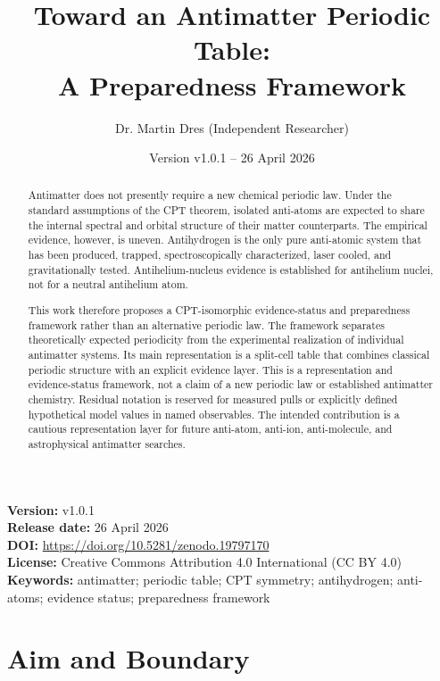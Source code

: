 \documentclass[11pt,a4paper]{article}
\title{Toward an Antimatter Periodic Table:\\
A Preparedness Framework}
\author{Dr. Martin Dres (Independent Researcher)}
\date{Version v1.0.1 -- 26 April 2026}
\begin{document}
\maketitle

\begin{center}
\small
\textbf{Version:} v1.0.1\\
\textbf{Release date:} 26 April 2026\\
\textbf{DOI:} \url{https://doi.org/10.5281/zenodo.19797170}\\
\textbf{License:} Creative Commons Attribution 4.0 International (CC BY 4.0)\\
\textbf{Keywords:} antimatter; periodic table; CPT symmetry; antihydrogen; anti-atoms; evidence status; preparedness framework
\end{center}

\begin{abstract}
Antimatter does not presently require a new chemical periodic law. Under the standard assumptions of the CPT theorem, isolated anti-atoms are expected to share the internal spectral and orbital structure of their matter counterparts. The empirical evidence, however, is uneven. Antihydrogen is the only pure anti-atomic system that has been produced, trapped, spectroscopically characterized, laser cooled, and gravitationally tested. Antihelium-nucleus evidence is established for antihelium nuclei, not for a neutral antihelium atom.

This work therefore proposes a CPT-isomorphic evidence-status and preparedness framework rather than an alternative periodic law. The framework separates theoretically expected periodicity from the experimental realization of individual antimatter systems. Its main representation is a split-cell table that combines classical periodic structure with an explicit evidence layer. This is a representation and evidence-status framework, not a claim of a new periodic law or established antimatter chemistry. Residual notation is reserved for measured pulls or explicitly defined hypothetical model values in named observables. The intended contribution is a cautious representation layer for future anti-atom, anti-ion, anti-molecule, and astrophysical antimatter searches.
\end{abstract}

\newpage
\tableofcontents
\newpage

\section{Aim and Boundary}
\end{document}
